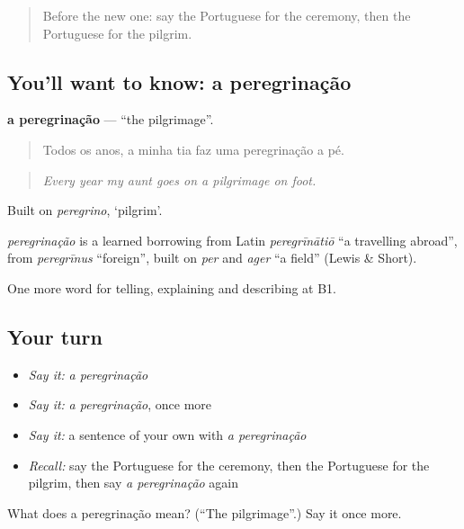 \label{lesson:PT-C320-peregrinacao}



\begin{quote}
Before the new one: say the Portuguese for the ceremony, then the Portuguese for the pilgrim.
\end{quote}

\subsection*{You'll want to know: a peregrinação}
\textbf{a peregrinação} — \textquotedblleft{}the pilgrimage\textquotedblright{}.

\begin{quote}
Todos os anos, a minha tia faz uma peregrinação a pé.
\end{quote}

\begin{quote}
\emph{Every year my aunt goes on a pilgrimage on foot.}
\end{quote}

Built on \emph{peregrino}, ‘pilgrim’.

\begin{cousinweb}
\emph{peregrinação} is a learned borrowing from Latin \emph{peregrīnātiō} \textquotedblleft{}a travelling abroad\textquotedblright{}, from \emph{peregrīnus} \textquotedblleft{}foreign\textquotedblright{}, built on \emph{per} and \emph{ager} \textquotedblleft{}a field\textquotedblright{} (Lewis \& Short).
\end{cousinweb}

\begin{grammarlens}[title={What you've built}]
One more word for telling, explaining and describing at B1.
\end{grammarlens}

\subsection*{Your turn}
\begin{itemize}
\raggedright
  \item \emph{Say it:} \emph{a peregrinação}
  \item \emph{Say it:} \emph{a peregrinação}, once more
  \item \emph{Say it:} a sentence of your own with \emph{a peregrinação}
  \item \emph{Recall:} say the Portuguese for the ceremony, then the Portuguese for the pilgrim, then say \emph{a peregrinação} again
\end{itemize}

\begin{tcolorbox}[breakable,colback=teal!4,colframe=teal!35!black,title={Before you move on}]
What does a peregrinação mean? (\textquotedblleft{}The pilgrimage\textquotedblright{}.) Say it once more.
\end{tcolorbox}
